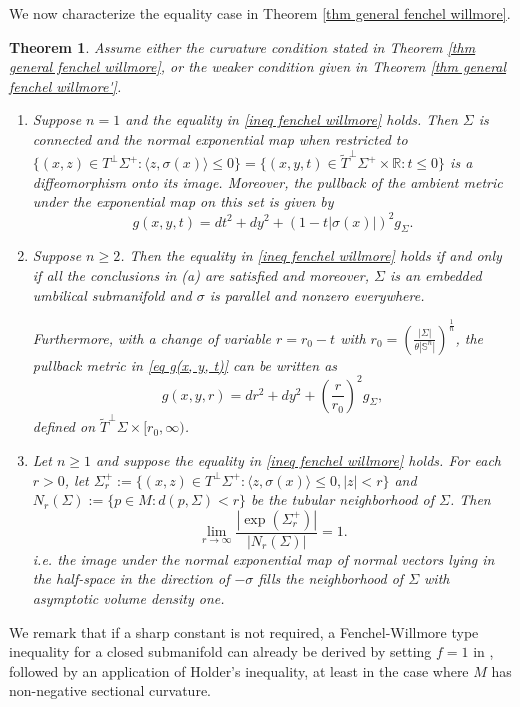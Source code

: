 \documentclass[11pt, reqno]{amsart}
\newtheorem{theorem}{Theorem}[section]
\numberwithin{equation}{section}
\begin{document}
We now characterize the equality case in Theorem \ref{thm general fenchel willmore}.
\begin{theorem} \label{thm equality case}
Assume either the curvature condition stated in Theorem \ref{thm general fenchel willmore}, or the weaker condition given in Theorem \ref{thm general fenchel willmore'}.

\begin{enumerate}
\item[(a)]
Suppose $n= 1$ and the equality in \eqref{ineq fenchel willmore} holds.
Then $\Sigma$ is connected and the normal exponential map when restricted to
$ \{(x, z)\in T^\perp\Sigma^{+}:\langle z, \sigma(x)\rangle\le0\}=
\{(x, y, t) \in \widetilde{T}^{\perp} \Sigma^{+} \times \mathbb{R}: t \le 0\}$
is a diffeomorphism onto its image. Moreover, the pullback of the ambient metric under the exponential map on this set is given by
\begin{equation}\label{eq g(x, y, t)}
g(x, y, t)=d t^2+d y^2+(1-t|\sigma(x)|)^2 g_{\Sigma}.
\end{equation}
\item[(b)]
Suppose $n\ge2$. Then the equality in \eqref{ineq fenchel willmore} holds if and only if all the conclusions in (a) are satisfied and moreover, $\Sigma$ is an embedded umbilical submanifold and $\sigma$ is parallel and nonzero everywhere.

Furthermore, with a change of variable $r=r_{0}-t$ with $r_0=\left(\frac{|\Sigma|}{\theta\left|\mathbb{S}^n\right|}\right)^{\frac{1}{n}}$,
the pullback metric in \eqref{eq g(x, y, t)} can be written as
$$g(x, y, r)=dr^{2}+dy^{2}+\left(\frac{r}{r_{0}}\right)^{2}g_{\Sigma}, $$
defined on $\widetilde T^\perp\Sigma\times[r_{0}, \infty)$.
\item [(c)]
Let $n \ge 1$ and suppose the equality in \eqref{ineq fenchel willmore} holds. For each $r>0$, let $\Sigma_r^{+}:=\{(x, z)\in T^{\perp}\Sigma^{+}:\langle z, \sigma(x)\rangle\le 0, |z|< r\}$
and $N_r(\Sigma):=\{p\in M:d(p, \Sigma)< r\}$ be the tubular neighborhood of $\Sigma$. Then
$$
\lim_{r\to\infty} \frac{|\exp(\Sigma_r^{+})|} {|N_r(\Sigma)|} =1.
$$
i.e. the image under the normal exponential map of normal vectors lying in the half-space in the direction of $-\sigma$ fills the neighborhood of $\Sigma$ with asymptotic volume density one.
\end{enumerate}
\end{theorem}

We remark that if a sharp constant is not required, a Fenchel-Willmore type inequality for a closed submanifold can already be derived by setting $f = 1$ in \cite[Theorem 1.4]{Brendle2023}, followed by an application of Holder's inequality, at least in the case where $M$ has non-negative sectional curvature.
\end{document}

